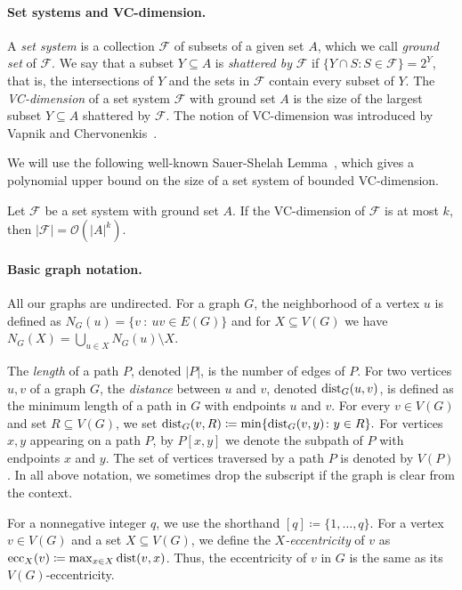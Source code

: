 \paragraph{Set systems and VC-dimension.}
A \emph{set system} is a collection $\mathcal{F}$ of subsets of a given set $A$, which we call \emph{ground set} of $\mathcal{F}$.
We say that a subset $Y\subseteq A$ is \emph{shattered by} $\mathcal{F}$
if $\{Y \cap S : S \in \mathcal{F}\} = 2^Y$, that is, the intersections of $Y$ and the sets in $\mathcal{F}$ contain every subset of $Y$.
The \emph{VC-dimension} of a set system $\mathcal{F}$ with ground set $A$
is the size of the largest subset $Y\subseteq A$ shattered by $\mathcal{F}$. The notion of VC-dimension was introduced by Vapnik and Chervonenkis~\cite{VapnikC71}.

We will use the following well-known Sauer-Shelah Lemma~\cite{Sauer72,Shelah72}, which gives a polynomial upper bound on the size of a set system of bounded VC-dimension.

\begin{lemma}\label{lem:sauer-shelah}
  Let $\mathcal{F}$ be a set system with ground set $A$.
  If the VC-dimension of $\mathcal{F}$ is at most $k$, then $|\mathcal{F}|=\mathcal{O}(|A|^k)$.
\end{lemma}

\paragraph{Basic graph notation.} All our graphs are undirected.
For a graph $G$, the neighborhood of a vertex $u$ is defined as $N_G(u) = \{v~\colon~uv \in E(G)\}$
and for $X \subseteq V(G)$ we have $N_G(X) = \bigcup_{u \in X} N_G(u) \setminus X$. 

The {\em{length}} of a path $P$, denoted $|P|$, is the number of edges of $P$.
For two vertices $u,v$ of a graph $G$, the {\em{distance}} between $u$ and $v$,
denoted $\mathrm{dist}_G(u,v)$, is defined as the minimum length of a path in $G$ with endpoints $u$ and $v$.
For every $v\in V(G)$ and set $R \subseteq V(G)$, we set $\mathrm{dist}_G(v,R)\coloneqq \min\{\mathrm{dist}_G(v,y)\colon y\in R\}.$
For vertices $x,y$ appearing on a path $P$, by $P[x,y]$ we denote the subpath of $P$ with endpoints $x$ and $y$.
The set of vertices traversed by a path $P$ is denoted by $V(P)$.
In all above notation, we sometimes drop the subscript if the graph is clear from the context.

For a nonnegative integer $q$, we use the shorthand $[q]\coloneqq\{1,\ldots,q\}$.
For a vertex $v \in V(G)$ and a set $X \subseteq V(G)$, we define the \emph{$X$-eccentricity} of $v$ as
$\mathrm{ecc}_X(v) \coloneqq \max_{x \in X} \mathrm{dist}(v,x)$.
Thus, the eccentricity of $v$ in $G$ is the same as its $V(G)$-eccentricity.

